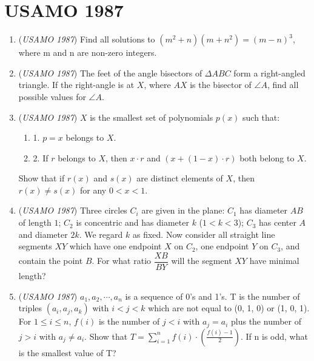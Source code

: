 \section{USAMO 1987}
        \begin{enumerate}
        	\item (\textit{USAMO 1987}) Find all solutions to $(m^2+n)(m + n^2)= (m - n)^3$, where m and n are non-zero integers.


 

	\item (\textit{USAMO 1987}) The feet of the angle bisectors of $\Delta ABC$ form a right-angled triangle. If the right-angle is at $X$, where $AX$ is the bisector of $\angle A$, find all possible values for $\angle A$.


 

	\item (\textit{USAMO 1987}) $X$ is the smallest set of polynomials $p(x)$ such that: 


 
            \begin{enumerate}[label=(\roman*)]
                \item 1. $p = x$ belongs to $X$.
\item 2. If $r$ belongs to $X$, then $x\cdot r$ and $(x + (1 - x) \cdot r )$ both belong to $X$.
            \end{enumerate}
            Show that if $r(x)$ and $s(x)$ are distinct elements of $X$, then $r(x) \neq s(x)$ for any $0 < x < 1$. 


 

	\item (\textit{USAMO 1987}) Three circles $C_i$ are given in the plane: $C_1$ has diameter $AB$ of length $1$; $C_2$ is concentric and has diameter $k$ ($1<k<3$); $C_3$ has center $A$ and diameter $2k$. We regard $k$ as fixed. Now consider all straight line segments $XY$ which have one endpoint $X$ on $C_2$, one endpoint $Y$ on $C_3$, and contain the point $B$. For what ratio $\dfrac{XB}{BY}$ will the segment $XY$ have minimal length?


 

	\item (\textit{USAMO 1987}) $a_1, a_2, \cdots, a_n$ is a sequence of 0's and 1's. T is the number of triples $(a_i, a_j, a_k)$ with $i<j<k$ which are not equal to (0, 1, 0) or (1, 0, 1). For $1\le i\le n$, $f(i)$ is the number of $j<i$ with $a_j = a_i$ plus the number of $j>i$ with $a_j\neq a_i$. Show that $T=\sum_{i=1}^n f(i)\cdot\left(\frac{f(i)-1}2\right)$. If n is odd, what is the smallest value of T?


 

\end{enumerate}